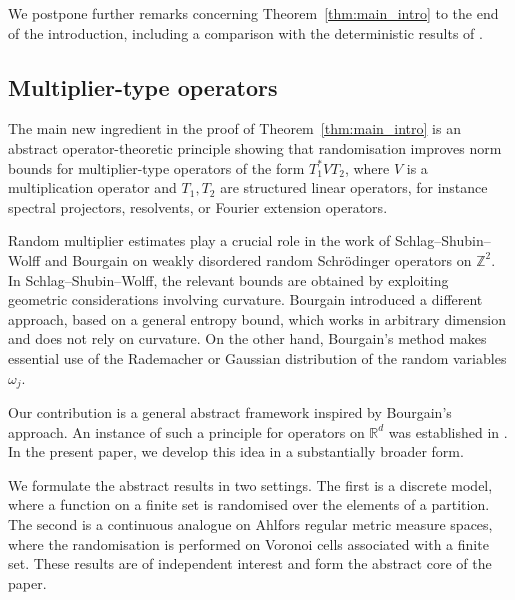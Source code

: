 \documentclass[12pt,reqno]{amsart}
\theoremstyle{definition}
\theoremstyle{remark}
\numberwithin{equation}{section}
\newcommand{\1}{\mathbbm{1}}
\begin{document}


We postpone further remarks concerning Theorem~\ref{thm:main_intro} to the end of the introduction, including a comparison with the deterministic results of \cite{Cuenin2026}.






\subsection{Multiplier-type operators}
The main new ingredient in the proof of Theorem~\ref{thm:main_intro} is an abstract operator-theoretic principle showing that randomisation improves norm bounds for multiplier-type operators of the form \(T_1^* V T_2\), where \(V\) is a multiplication operator and \(T_1,T_2\) are structured linear operators, for instance spectral projectors, resolvents, or Fourier extension operators.

Random multiplier estimates play a crucial role in the work of Schlag--Shubin--Wolff \cite{Schlagetal2002} and Bourgain \cite{Bourgain2002,Bourgain2003} on weakly disordered random Schr\"odinger operators on \(\mathbb{Z}^2\). In Schlag--Shubin--Wolff, the relevant bounds are obtained by exploiting geometric considerations involving curvature. Bourgain introduced a different approach, based on a general entropy bound, which works in arbitrary dimension and does not rely on curvature. On the other hand, Bourgain's method makes essential use of the Rademacher or Gaussian distribution of the random variables \(\omega_j\).
 

Our contribution is a general abstract framework inspired by Bourgain's approach. An instance of such a principle for operators on \(\mathbb{R}^d\) was established in \cite{CueninMerz2025}. In the present paper, we develop this idea in a substantially broader form.

We formulate the abstract results in two settings. The first is a discrete model, where a function on a finite set is randomised over the elements of a partition. The second is a continuous analogue on Ahlfors regular metric measure spaces, where the randomisation is performed on Voronoi cells associated with a finite set. These results are of independent interest and form the abstract core of the paper.
\end{document}
